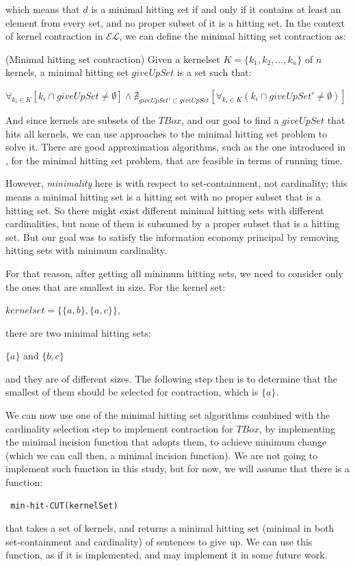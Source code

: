 which means that $d$ is a minimal hitting set if and only if it contains at least an element from every set, and no proper subset of it is a hitting set. In the context of kernel contraction in $\mathcal{EL}$, we can define the minimal hitting set contraction as:
\begin{defn}(Minimal hitting set contraction)
Given a kernelset $K=\{k_{1}, k_{2}, ..., k_{n}\}$ of $n$ kernels, a minimal hitting set $giveUpSet$ is a set such that:
\begin{center}
$\forall_{k_{i} \in K} [ k_{i} \cap giveUpSet \neq \emptyset] \wedge \nexists_{giveUpSet' \subset giveUpSet}[\forall_{k_{i} \in K} (k_{i} \cap giveUpSet' \neq \emptyset) ]$
\end{center}
\end{defn}

And since kernels are subsets of the $TBox$, and our goal to find a $giveUpSet$ that hits all kernels, we can use approaches to the minimal hitting set problem to solve it. There are good approximation algorithms, such as the one introduced in \cite{hit}, for the minimal hitting set problem, that are feasible in terms of running time. 

However, \textit{minimality} here is with respect to set-containment, not cardinality; this means a minimal hitting set is a hitting set with no proper subset that is a hitting set. So there might exist different minimal hitting sets with different cardinalities, but none of them is subsumed by a proper subset that is a hitting set\cite{hit}. But our goal was to satisfy the information economy principal by removing hitting sets with minimum cardinality. 

For that reason, after getting all minimum hitting sets, we need to consider only the ones that are smallest in size. For the kernel set:
\begin{center}
$kernelset = \lbrace \lbrace a, b \rbrace , \lbrace a, c \rbrace \rbrace$,
\end{center}
there are two minimal hitting sets:
\begin{center}
$\lbrace a \rbrace$ \hspace{1cm} and \hspace{1cm} $\lbrace b, c \rbrace$
\end{center}
and they are of different sizes. The following step then is to determine that the smallest of them should be selected for contraction, which is $\lbrace a \rbrace$.

We can now use one of the minimal hitting set algorithms combined with the cardinality selection step to implement contraction for $TBox$, by implementing the minimal incision function that adopts them, to achieve minimum change (which we can call then, a minimal incision function). We are not going to implement such function in this study, but for now, we will assume that there is a function:
\begin{verbatim}
 min-hit-CUT(kernelSet)
\end{verbatim}
that takes a set of kernels, and returns a minimal hitting set (minimal in both set-containment and cardinality) of sentences to give up. We can use this function, as if it is implemented, and may implement it in some future work.

